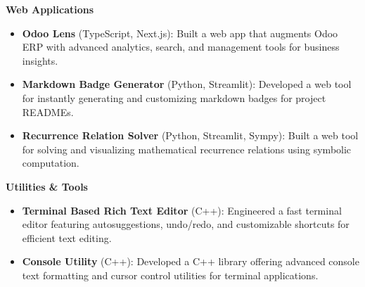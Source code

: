\documentclass[10pt, a4paper]{article}
\newenvironment{highlights}{
    \begin{itemize}[
        topsep=0.1 cm,
        parsep=0.1 cm,
        partopsep=0pt,
        itemsep=0pt,
        leftmargin=0.4 cm + 10pt
    ]
}{
    \end{itemize}
} %
\let\hrefWithoutArrow\href
\renewcommand{\href}[2]{\hrefWithoutArrow{#1}{\ifthenelse{\equal{#2}{}}{ }{#2 }\raisebox{.15ex}{\footnotesize \faExternalLink*}}}
\begin{document}
\vspace{0.2 cm}

\textbf{Web Applications}
\begin{highlights}
    \item \textbf{Odoo Lens} (TypeScript, Next.js): Built a web app that augments Odoo ERP with advanced analytics, search, and management tools for business insights. \href{https://github.com/abdxdev/odoo-lens}{}
    \item \textbf{Markdown Badge Generator} (Python, Streamlit): Developed a web tool for instantly generating and customizing markdown badges for project READMEs. \href{https://github.com/abdxdev/Markdown-badge-generator}{}
    \item \textbf{Recurrence Relation Solver} (Python, Streamlit, Sympy): Built a web tool for solving and visualizing mathematical recurrence relations using symbolic computation. \href{https://github.com/abdxdev/Recurrence-Relation-Solver}{}
\end{highlights}

\vspace{0.2 cm}

\textbf{Utilities \& Tools}
\begin{highlights}
    \item \textbf{Terminal Based Rich Text Editor} (C++): Engineered a fast terminal editor featuring autosuggestions, undo/redo, and customizable shortcuts for efficient text editing. \href{https://github.com/abdxdev/Terminal-Based-Rich-Text-Editor}{}
    \item \textbf{Console Utility} (C++): Developed a C++ library offering advanced console text formatting and cursor control utilities for terminal applications. \href{https://github.com/abdxdev/Console-Utility}{}
\end{highlights}
\end{document}
